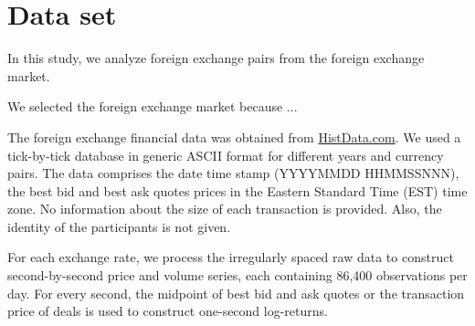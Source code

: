 \section{Data set}\label{sec:data_set}

In this study, we analyze foreign exchange pairs from the foreign exchange market.

We selected the foreign exchange market because ...

The foreign exchange financial data was obtained from
\href{www.histdata.com}{HistData.com}. We used a tick-by-tick database in generic ASCII
format for different years and currency pairs. The data comprises the date time
stamp (YYYYMMDD HHMMSSNNN),
the best bid and best ask quotes prices in the Eastern Standard Time (EST) time zone.
No information about the size of each transaction is provided. Also, the
identity of the participants is not given.

For each exchange rate, we process the irregularly
spaced raw data to construct second-by-second price and volume series, each
containing 86,400 observations per day. For every second, the midpoint of best
bid and ask quotes or the transaction price of deals is used to construct
one-second log-returns.



